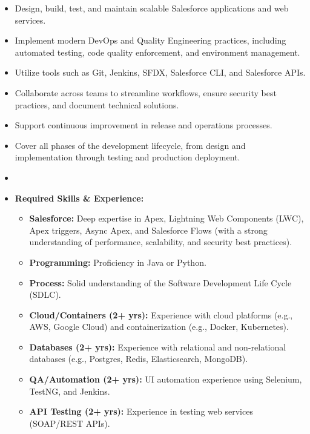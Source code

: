 \documentclass[11pt]{article}
\begin{document}
\begin{itemize}
  \item Design, build, test, and maintain scalable Salesforce applications 
    and web services.
  \item Implement modern DevOps and Quality Engineering practices, including 
    automated testing, code quality enforcement, and environment management.
  \item Utilize tools such as Git, Jenkins, SFDX, Salesforce CLI, and 
    Salesforce APIs.
  \item Collaborate across teams to streamline workflows, ensure security 
    best practices, and document technical solutions.
  \item Support continuous improvement in release and operations processes.
  \item Cover all phases of the development lifecycle, from design and 
    implementation through testing and production deployment.

  \item \hrulefill
  \item \textbf{Required Skills \& Experience:}
  \begin{itemize}
    \item \textbf{Salesforce:} Deep expertise in Apex, Lightning Web Components 
      (LWC), Apex triggers, Async Apex, and Salesforce Flows (with a strong 
      understanding of performance, scalability, and security best practices).
    \item \textbf{Programming:} Proficiency in Java or Python.
    \item \textbf{Process:} Solid understanding of the Software Development 
      Life Cycle (SDLC).
    \item \textbf{Cloud/Containers (2+ yrs):} Experience with cloud platforms 
      (e.g., AWS, Google Cloud) and containerization (e.g., Docker, Kubernetes).
    \item \textbf{Databases (2+ yrs):} Experience with relational and 
      non-relational databases (e.g., Postgres, Redis, Elasticsearch, MongoDB).
    \item \textbf{QA/Automation (2+ yrs):} UI automation experience using 
      Selenium, TestNG, and Jenkins.
    \item \textbf{API Testing (2+ yrs):} Experience in testing web services 
      (SOAP/REST APIs).
  \end{itemize}
  

\end{itemize}
\end{document}
